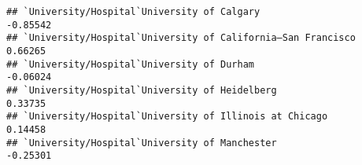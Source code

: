 \documentclass[]{article}
\begin{document}
\begin{verbatim}
## `University/Hospital`University of Calgary                                                                                                                                                                                                                                                                                                                                                                                                                                      -0.85542
## `University/Hospital`University of California–San Francisco                                                                                                                                                                                                                                                                                                                                                                                                                      0.66265
## `University/Hospital`University of Durham                                                                                                                                                                                                                                                                                                                                                                                                                                       -0.06024
## `University/Hospital`University of Heidelberg                                                                                                                                                                                                                                                                                                                                                                                                                                    0.33735
## `University/Hospital`University of Illinois at Chicago                                                                                                                                                                                                                                                                                                                                                                                                                           0.14458
## `University/Hospital`University of Manchester                                                                                                                                                                                                                                                                                                                                                                                                                                   -0.25301

\end{verbatim}
\end{document}
